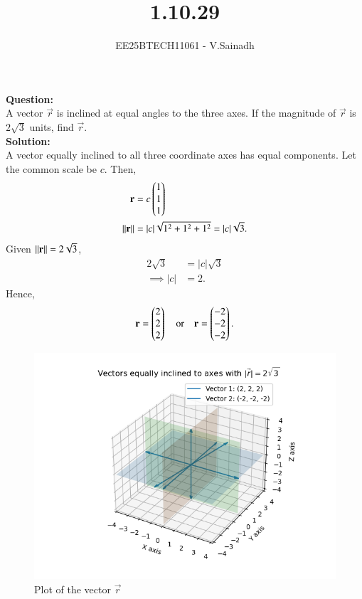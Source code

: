 \documentclass[12pt,journal,onecolumn]{IEEEtran} %
\begin{document}

\vspace{3cm}

\title{1.10.29}
\author{EE25BTECH11061 - V.Sainadh}

\maketitle
{\let\newpage\relax\maketitle}
\renewcommand{\thefigure}{\theenumi}
\renewcommand{\thetable}{\theenumi}
\setlength{\intextsep}{10pt}

\textbf{Question:}\\
A vector $\vec{r}$ is inclined at equal angles to the three axes. If the magnitude of $\vec{r}$ is $2\sqrt{3}$ units, find $\vec{r}$.\\

\textbf{Solution:}\\
A vector equally inclined to all three coordinate axes has equal components. Let the common scale be $c$. Then,
\begin{align}
	\mathbf{r} &= c\begin{pmatrix}1\\1\\1\end{pmatrix} \\
	\left\lVert\mathbf{r}\right\rVert &= |c|\sqrt{1^2+1^2+1^2} = |c|\sqrt{3}.
\end{align}
Given $\left\lVert\mathbf{r}\right\rVert = 2\sqrt{3}$,
\begin{align}
	2\sqrt{3} &= |c|\sqrt{3} \\
	\implies |c| &= 2.
\end{align}
Hence,
\begin{align}
	\mathbf{r} = \begin{pmatrix}2\\2\\2\end{pmatrix}\quad \text{or}\quad \mathbf{r}=\begin{pmatrix}-2\\-2\\-2\end{pmatrix}.
\end{align}

\begin{figure}[h!]
   \centering
   \includegraphics[width=0.8\columnwidth]{figs/Figure_1.png}
   \caption{Plot of the vector $\vec{r}$}
   \label{Plot_1}
\end{figure}
\end{document}
